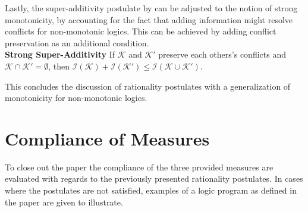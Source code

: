 Lastly, the super-additivity postulate by \cite{thimm_measuring_2009} can be adjusted to the notion of strong monotonicity, by accounting for the fact that adding information might resolve conflicts for non-monotonic logics. This can be achieved by adding conflict preservation as an additional condition.
\\
\textbf{Strong Super-Additivity}
If \(\mathcal{K}\) and \(\mathcal{K}'\) preserve each others's conflicts and \(\mathcal{K} \cap \mathcal{K}' = \emptyset\), then \(\mathcal{I}(\mathcal{K}) + \mathcal{I}(\mathcal{K}') \leq \mathcal{I}(\mathcal{K} \cup \mathcal{K}')\).

This concludes the discussion of rationality postulates with a generalization of monotonicity for non-monotonic logics.

\section{Compliance of Measures}
To close out the paper the compliance of the three provided measures are evaluated with regards to the previously presented rationality postulates. In cases where the postulates are not satisfied, examples of a logic program as defined in the paper are given to illustrate.


